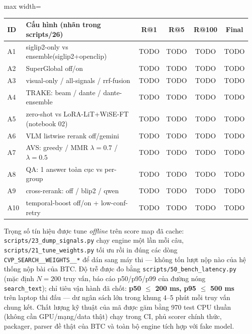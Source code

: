 \documentclass{ai_conquer2026}
\begin{document}
\begin{table}[H]
\centering
\begin{adjustbox}{max width=\linewidth}
\begin{tabular}{@{}llcccc@{}}
\toprule
\textbf{ID} & \textbf{Cấu hình (nhãn trong scripts/26)} & \textbf{R@1} & \textbf{R@5} & \textbf{R@100} & \textbf{Final} \\
\midrule
A1 & siglip2-only vs ensemble(siglip2+openclip) & TODO & TODO & TODO & TODO \\
A2 & SuperGlobal off/on & TODO & TODO & TODO & TODO \\
A3 & visual-only / all-signals / rrf-fusion & TODO & TODO & TODO & TODO \\
A4 & TRAKE: beam / dante / dante-ensemble & TODO & TODO & TODO & TODO \\
A5 & zero-shot vs LoRA-LiT+WiSE-FT (notebook 02) & TODO & TODO & TODO & TODO \\
A6 & VLM listwise rerank off/gemini & TODO & TODO & TODO & TODO \\
A7 & AVS: greedy / MMR $\lambda{=}0.7$ / $\lambda{=}0.5$ & TODO & TODO & TODO & TODO \\
A8 & QA: 1 answer toàn cục vs per-group & TODO & TODO & TODO & TODO \\
A9 & cross-rerank: off / blip2 / qwen & TODO & TODO & TODO & TODO \\
A10 & temporal-boost off/on + low-conf-retry & TODO & TODO & TODO & TODO \\
\bottomrule
\end{tabular}
\end{adjustbox}
\end{table}

Trọng số tín hiệu được tune \emph{offline} trên score map đã cache: \texttt{scripts/23\_dump\_signals.py}
chạy engine một lần mỗi câu, \texttt{scripts/21\_tune\_weights.py} tối ưu rồi in đúng các dòng
\texttt{CVP\_SEARCH\_\_WEIGHTS\_\_*} để dán sang máy thi --- không tốn lượt nộp nào của hệ thống nộp bài của BTC.
Độ trễ được đo bằng \texttt{scripts/50\_bench\_latency.py} (mặc định $N{=}200$ truy vấn, báo cáo
p50/p95/p99 của đường nóng \texttt{search\_text}); chỉ tiêu vận hành đã chốt: \textbf{p50
$\le$ 200 ms, p95 $\le$ 500 ms} trên laptop thi đấu --- dư ngân sách lớn trong khung 4--5 phút
mỗi truy vấn chung kết. %
Chất lượng kỹ thuật của mã được găm bằng 970 test CPU thuần (không cần GPU/mạng/data thật)
chạy trong CI, phủ scorer chính thức, packager, parser đề thật của BTC và toàn bộ engine
tích hợp với fake model.
\end{document}
